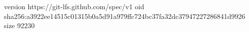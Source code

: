 version https://git-lfs.github.com/spec/v1
oid sha256:a3922ee14515c01315b0a5d91a979ffc724bc37fa32dc37947227286841d9926
size 92230
